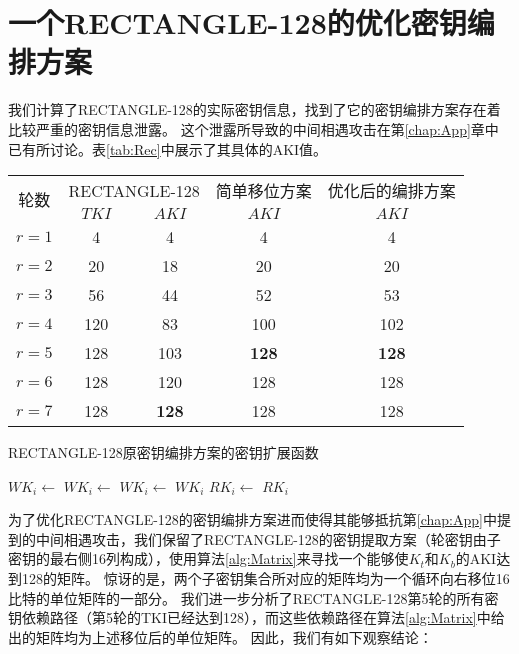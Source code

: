 \section{一个RECTANGLE-128的优化密钥编排方案}
我们计算了RECTANGLE-128的实际密钥信息，找到了它的密钥编排方案存在着比较严重的密钥信息泄露。
这个泄露所导致的中间相遇攻击在第\ref{chap:App}章中已有所讨论。表\ref{tab:Rec}中展示了其具体的AKI值。
\begin{table}[htbp]
    \centering
    \begin{tabular}{c|c|c|c|c}
        \multirow{2}{*}{轮数} & \multicolumn{2}{c|}{RECTANGLE-128} & 简单移位方案 & 优化后的编排方案\\
        \cline{2-5}
        & $TKI$ & $AKI$ & $AKI$ &$ AKI $\\
        \hline
        $r=1$ & 4 & 4 & 4 & 4\\
        $r=2$ & 20 & 18 & 20 & 20\\
        $r=3$ & 56 & 44 & 52 & 53\\ 
        $r=4$ & 120 & 83 & 100 & 102\\ 
        $r=5$ & 128 & 103 & \textbf{128} &\textbf{128}\\ 
        $r=6$ & 128 & 120 & 128 & 128\\ 
        $r=7$ & 128 & \textbf{128} & 128& 128\\ 
        \hline
    \end{tabular}
\end{table}
\begin{algorithm}
    \caption{RECTANGLE-128原密钥编排方案的密钥扩展函数}
    \begin{algorithmic}[1]
        \State $WK_i \gets$ 
        \State $WK_i \gets$ 
        \State $WK_i \gets$ 
        \State \Return $WK_i$
        \EndFunction
        \State $RK_i \gets$ 
        \State \Return $RK_i$
        \EndFunction
    \end{algorithmic}
    \label{alg:key}
\end{algorithm}

为了优化RECTANGLE-128的密钥编排方案进而使得其能够抵抗第\ref{chap:App}中提到的中间相遇攻击，我们保留了RECTANGLE-128的密钥提取方案（轮密钥由子密钥的最右侧16列构成），使用算法\ref{alg:Matrix}来寻找一个能够使$K_t$和$K_b$的AKI达到128的矩阵。
惊讶的是，两个子密钥集合所对应的矩阵均为一个循环向右移位16比特的单位矩阵的一部分。
我们进一步分析了RECTANGLE-128第5轮的所有密钥依赖路径（第5轮的TKI已经达到128），而这些依赖路径在算法\ref{alg:Matrix}中给出的矩阵均为上述移位后的单位矩阵。
因此，我们有如下观察结论：

